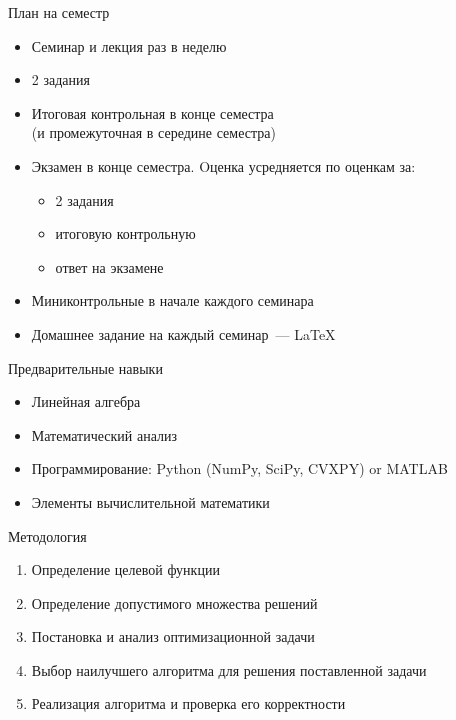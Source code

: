 \documentclass[12pt]{beamer}
\begin{document}
\begin{frame}{План на семестр}
\begin{itemize}
\item Семинар и лекция раз в неделю
\item 2 задания
\item Итоговая контрольная в конце семестра \\ (и промежуточная в середине семестра)
\item Экзамен в конце семестра. Oценка усредняется по оценкам за:
\begin{itemize}
\item 2 задания
\item итоговую контрольную
\item ответ на экзамене
\end{itemize}
\item Миниконтрольные в начале каждого семинара
\item Домашнее задание на каждый семинар~--- \LaTeX
\end{itemize}
\end{frame}

\begin{frame}{Предварительные навыки}
\begin{itemize}
\item Линейная алгебра
\item Математический анализ
\item Программирование: Python (NumPy, SciPy, CVXPY) or MATLAB
\item Элементы вычислительной математики
\end{itemize}
\end{frame}

\begin{frame}{Методология}
\begin{enumerate}
\item Определение целевой функции
\item Определение допустимого множества решений
\item Постановка и анализ оптимизационной задачи
\item Выбор наилучшего алгоритма для решения поставленной задачи
\item Реализация алгоритма и проверка его корректности
\end{enumerate}

\end{frame}
\end{document}
